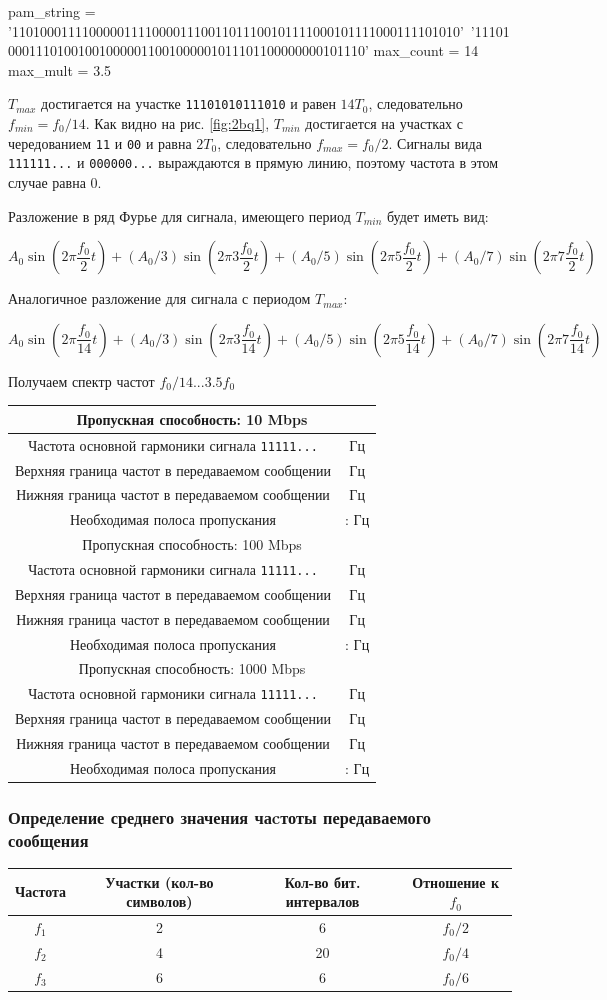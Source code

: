 \documentclass[12pt, a4paper]{article}
\newcommand{\bandwidthEntry}[2]{
  \hline
  \multicolumn{2}{|c|}{Пропускная способность: #1 Mbps} \\
  \hline
  Частота основной гармоники сигнала \texttt{11111...} & \py{int(f_0[#1] * #2)} Гц \\
  Верхняя граница частот в передаваемом сообщении & \py{int(max_mult * f_0[#1])} Гц \\
  Нижняя граница частот в передаваемом сообщении & \py{int(f_0[#1] / max_count)} Гц \\
  Необходимая полоса пропускания & \py{int(f_0[#1] / max_count)} : \py{int(max_mult * f_0[#1])} Гц \\
}
\begin{document}
\begin{pycode}
pam_string = '1101000111100000111100001110011011100101111000101111000111101010'\
  '11101000111010010010000011001000001011101100000000101110'
max_count = 14
max_mult = 3.5
\end{pycode}

$T_{max}$ достигается на участке \texttt{11101010111010} и равен $14 T_0$,
следовательно $f_{min} = f_0 / 14$. Как видно на рис. \ref{fig:2bq1}, $T_{min}$
достигается на участках с чередованием \texttt{11} и \texttt{00} и равна $2 T_0$,
следовательно $f_{max} = f_0 / 2$. Сигналы вида \texttt{111111...} и
\texttt{000000...} выраждаются в прямую линию, поэтому частота в этом случае равна 0.

Разложение в ряд Фурье для сигнала, имеющего период $T_{min}$ будет иметь вид:

$$A_0 \sin(2 \pi \frac{f_0}{2} t) + (A_0 / 3) \sin(2 \pi 3 \frac{f_0}{2} t) +
  (A_0 / 5) \sin(2 \pi 5 \frac{f_0}{2} t) + (A_0 / 7) \sin(2 \pi 7 \frac{f_0}{2} t)$$

Аналогичное разложение для сигнала с периодом $T_{max}$:

$$A_0 \sin(2 \pi \frac{f_0}{14} t) + (A_0 / 3) \sin(2 \pi 3 \frac{f_0}{14} t) +
  (A_0 / 5) \sin(2 \pi 5 \frac{f_0}{14} t) + (A_0 / 7) \sin(2 \pi 7 \frac{f_0}{14} t)$$

Получаем спектр частот $f_0 / 14 ... 3.5 f_0$

\begin{tabular}{| c | c |}
  \bandwidthEntry{10}{0}
  \bandwidthEntry{100}{0}
  \bandwidthEntry{1000}{0}
  \hline
\end{tabular}

\subsubsection*{Определение среднего значения чаcтоты передаваемого сообщения}

\begin{center}
\begin{tabular}{| c | c | c | c |}
  \hline
  Частота & Участки (кол-во символов) & Кол-во бит. интервалов & Отношение к $f_0$\\
  \hline
  $f_1$ & 2 & 6 & $f_0 / 2$\\
  $f_2$ & 4 & 20 & $f_0 / 4$\\
  $f_3$ & 6 & 6 & $f_0 / 6$\\
  \hline
\end{tabular}
\end{center}
\end{document}
